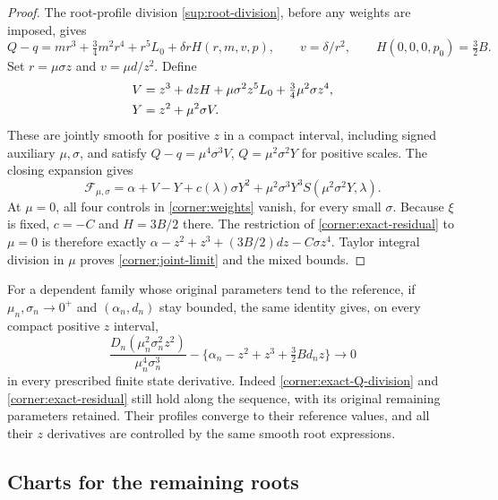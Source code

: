 \begin{proof}
The root-profile division
\eqref{sup:root-division}, before any weights are imposed, gives
\begin{equation}\label{corner:exact-Q-division}
 Q-q=mr^3+\tfrac34m^2r^4+r^5L_0+\delta rH(r,m,v,p),
 \qquad v=\delta/r^2,\qquad H(0,0,0,p_0)=\tfrac32B.
\end{equation}
Set $r=\mu\sigma z$ and $v=\mu d/z^2$.  Define
\begin{align}
 V&=z^3+dzH+\mu\sigma^2z^5L_0
                    +\tfrac34\mu^2\sigma z^4,\notag\\
 Y&=z^2+\mu^2\sigma V.                  \label{corner:VY}
\end{align}
These are jointly smooth for positive $z$ in a compact interval,
including signed auxiliary $\mu,\sigma$, and satisfy
$Q-q=\mu^4\sigma^3V$, $Q=\mu^2\sigma^2Y$ for positive scales.
The closing expansion gives
\begin{equation}\label{corner:exact-residual}
 \mathcal F_{\mu,\sigma}
 =\alpha+V-Y+c(\lambda)\sigma Y^2
       +\mu^2\sigma^3Y^3S(\mu^2\sigma^2Y,\lambda).
\end{equation}
At $\mu=0$, all four controls in
\eqref{corner:weights} vanish, for every small $\sigma$.
Because $\xi$ is fixed, $c=-C$ and $H=3B/2$ there.  The restriction of
\eqref{corner:exact-residual} to $\mu=0$ is therefore exactly
$\alpha-z^2+z^3+(3B/2)dz-C\sigma z^4$.
Taylor integral division in $\mu$ proves \eqref{corner:joint-limit}
and the mixed bounds.
\end{proof}

For a dependent family whose original parameters tend to the reference,
if $\mu_n,\sigma_n\to0^+$ and $(\alpha_n,d_n)$ stay bounded, the same
identity gives, on every compact positive $z$ interval,
\begin{equation}\label{corner:sequence-limit}
 \frac{D_n(\mu_n^2\sigma_n^2z^2)}
           {\mu_n^4\sigma_n^3}
 -\{\alpha_n-z^2+z^3+\tfrac32Bd_nz\}\longrightarrow0
\end{equation}
in every prescribed finite state derivative.  Indeed
\eqref{corner:exact-Q-division} and \eqref{corner:exact-residual} still
hold along the sequence, with its original remaining parameters retained.
Their profiles converge to their reference values, and all their
$z$ derivatives are controlled by the same smooth root expressions.

\subsection{Charts for the remaining roots}

